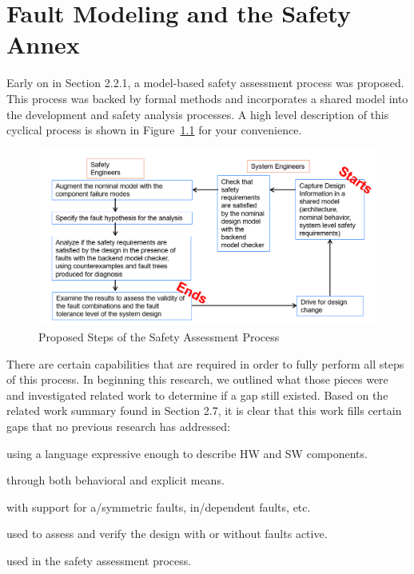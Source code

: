 \chapter{Fault Modeling and the Safety Annex}
\label{chap:faultModeling}
Early on in Section 2.2.1, a model-based safety assessment process was proposed. This process was backed by formal methods and incorporates a shared model into the development and safety analysis processes. A high level description of this cyclical process is shown in Figure~\ref{fig:SACycle} for your convenience. 

\begin{figure}[h]
	\begin{center}
		\includegraphics[width=\textwidth]{images/SACycle.PNG}
	\end{center}
	\caption{Proposed Steps of the Safety Assessment Process}
	\label{fig:SACycle}
\end{figure}

There are certain capabilities that are required in order to fully perform all steps of this process. In beginning this research, we outlined what those pieces were and investigated related work to determine if a gap still existed. Based on the related work summary found in Section 2.7, it is clear that this work fills certain gaps that no previous research has addressed:

\begin{description}[nosep]

    \item[Shared model] using a language expressive enough to describe HW and SW components.
    \item[Flexible error propagations] through both behavioral and explicit means.
    \item[Flexible fault modeling] with support for a/symmetric faults, in/dependent faults, etc.
    \item[Model checker] used to assess and verify the design with or without faults active.
    \item[Ability to generate artifacts] used in the safety assessment process.
\end{description}

